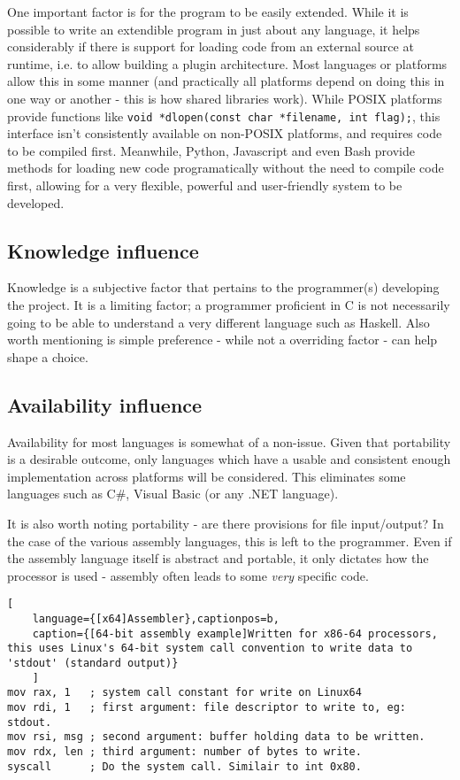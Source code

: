 \documentclass[10pt,a4paper,notitlepage]{report}
\begin{document}
One important factor is for the program to be easily extended. While it is possible to write an extendible program in just about any language, it helps considerably if there is support for loading code from an external source at runtime, i.e. to allow building a plugin architecture.
Most languages or platforms allow this in some manner (and practically all platforms depend on doing this in one way or another - this is how shared libraries work). While POSIX platforms provide functions like \lstinline$void *dlopen(const char *filename, int flag);$, this interface isn't consistently available on non-POSIX platforms, and requires code to be compiled first. Meanwhile, Python, Javascript and even Bash provide methods for loading new code programatically without the need to compile code first, allowing for a very flexible, powerful and user-friendly system to be developed.

\subsection{Knowledge influence}
Knowledge is a subjective factor that pertains to the programmer(s) developing the project. It is a limiting factor; a programmer proficient in C is not necessarily going to be able to understand a very different language such as Haskell. Also worth mentioning is simple preference - while not a overriding factor - can help shape a choice.

\subsection{Availability influence}
Availability for most languages is somewhat of a non-issue. Given that portability is a desirable outcome, only languages which have a usable and consistent enough implementation across platforms will be considered. This eliminates some languages such as C\#, Visual Basic (or any .NET language).

It is also worth noting portability - are there provisions for file input/output? In the case of the various assembly languages, this is left to the programmer. Even if the assembly language itself is abstract and portable, it only dictates how the processor is used - assembly often leads to some \emph{very} specific code.

\begin{lstlisting}[
	language={[x64]Assembler},captionpos=b,
	caption={[64-bit assembly example]Written for x86-64 processors, this uses Linux's 64-bit system call convention to write data to 'stdout' (standard output)}
	]
mov rax, 1   ; system call constant for write on Linux64
mov rdi, 1   ; first argument: file descriptor to write to, eg: stdout.
mov rsi, msg ; second argument: buffer holding data to be written.
mov rdx, len ; third argument: number of bytes to write.
syscall      ; Do the system call. Similair to int 0x80.
\end{lstlisting}
\end{document}
